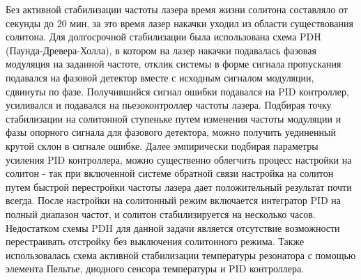 Без активной стабилизации частоты лазера время жизни солитона составляло от секунды до 20 мин, за это время лазер накачки уходил из области существования солитона. Для долгосрочной стабилизации была использована схема PDH (Паунда-Древера-Холла), в котором на лазер накачки подавалась фазовая модуляция на заданной частоте, отклик системы в форме сигнала пропускания подавался на фазовой детектор вместе с исходным сигналом модуляции, сдвинуты по фазе. Получившийся сигнал ошибки подавался на PID контроллер, усиливался и подавался на пьезоконтроллер частоты лазера. Подбирая точку стабилизации на солитонной ступеньке путем изменения частоты модуляции и фазы опорного сигнала для фазового детектора, можно получить уединенный крутой склон в сигнале ошибке. Далее эмпирически подбирая параметры усиления PID контроллера, можно существенно облегчить процесс настройки на солитон - так при включенной системе обратной связи настройка на солитон путем быстрой перестройки частоты лазера дает положительный результат почти всегда. После настройки на солитонный режим включается интегратор PID на полный диапазон частот, и солитон стабилизируется на несколько часов. Недостатком схемы PDH для данной задачи является отсутствие возможности перестраивать отстройку без выключения солитонного режима. Также использовалась схема активной стабилизации температуры резонатора с помощью элемента Пельтье, диодного сенсора температуры и PID контроллера.


